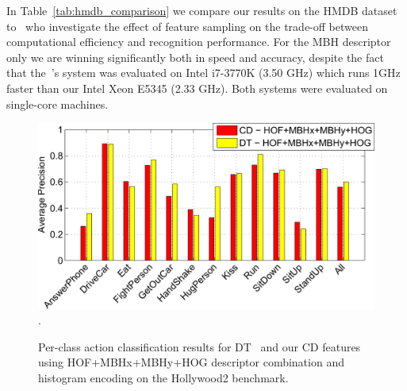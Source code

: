 \documentclass[10pt,twocolumn,letterpaper]{article}
\begin{document}
In Table~\ref{tab:hmdb_comparison} we compare our results on the HMDB dataset to~\cite{Feng13} who investigate the effect of feature sampling on the trade-off between computational efficiency and recognition performance. For the MBH descriptor only we are winning significantly both in speed and accuracy, despite the fact that the~\cite{Feng13}'s system was evaluated on Intel i7-3770K (3.50 GHz) which runs 1GHz faster than our Intel Xeon E5345 (2.33 GHz). Both systems were evaluated on single-core machines.



\begin{figure}
\begin{center}
\includegraphics[width=.9\linewidth]{figures/hollywood2-per-class-barplot-crop.pdf}.
\caption{Per-class action classification results for DT~\cite{Wang12} and our  CD features using HOF+MBHx+MBHy+HOG descriptor combination and histogram encoding on the Hollywood2 benchmark.\vspace{-.1cm}}
\label{fig:hwd2-barplot}
\end{center}
\end{figure}
\end{document}
